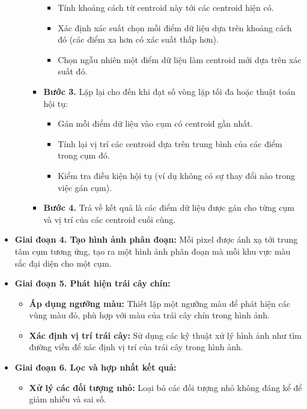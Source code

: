 \documentclass[a4paper]{article}
\begin{document}
\begin{itemize}[label={}]
\begin{itemize}[label={}]
\begin{itemize}[label={}]
            \begin{itemize}[label={}]
                \item Tính khoảng cách từ centroid này tới các centroid hiện có.
                \item Xác định xác suất chọn mỗi điểm dữ liệu dựa trên khoảng cách đó (các điểm xa hơn có xác suất thấp hơn).
                \item Chọn ngẫu nhiên một điểm dữ liệu làm centroid mới dựa trên xác suất đó.
            \end{itemize}
            \item \textbf{Bước 3. }Lặp lại cho đến khi đạt số vòng lặp tối đa hoặc thuật toán hội tụ:
            \begin{itemize}[label={}]
                \item Gán mỗi điểm dữ liệu vào cụm có centroid gần nhất.
                \item Tính lại vị trí các centroid dựa trên trung bình của các điểm trong cụm đó.
                \item Kiểm tra điều kiện hội tụ (ví dụ không có sự thay đổi nào trong việc gán cụm).
            \end{itemize}
            \item \textbf{Bước 4. }Trả về kết quả là các điểm dữ liệu được gán cho từng cụm và vị trí của các centroid cuối cùng.
        \end{itemize}
    \end{itemize} 
    \item \textbf{Giai đoạn 4. Tạo hình ảnh phân đoạn:} Mỗi pixel được ánh xạ tới trung tâm cụm tương ứng, tạo ra một hình ảnh phân đoạn mà mỗi khu vực màu sắc đại diện cho một cụm.
    \item \textbf{Giai đoạn 5. Phát hiện trái cây chín:}
    \begin{itemize}[label={}]
        \item \textbf{Áp dụng ngưỡng màu:} Thiết lập một ngưỡng màu để phát hiện các vùng màu đỏ, phù hợp với màu của trái cây chín trong hình ảnh.
        \item \textbf{Xác định vị trí trái cây:} Sử dụng các kỹ thuật xử lý hình ảnh như tìm đường viền để xác định vị trí của trái cây trong hình ảnh.
    \end{itemize}
    \item \textbf{Giai đoạn 6. Lọc và hợp nhất kết quả:}
    \begin{itemize}[label={}]
        \item \textbf{Xử lý các đối tượng nhỏ:} Loại bỏ các đối tượng nhỏ không đáng kể để giảm nhiễu và sai số.

\end{itemize}
\end{itemize}
\end{document}
